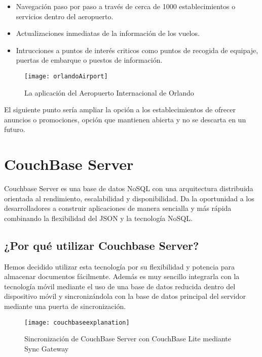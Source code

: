 \begin{itemize}
\item Navegación paso por paso a través de cerca de 1000 establecimientos o servicios dentro del aeropuerto. 
\item Actualizaciones inmediatas de la información de los vuelos. 
\item Intrucciones a puntos de interés criticos como puntos de recogida de equipaje, puertas de embarque o puestos de información.
\end{itemize}

\begin{figure}[H]
	\centering
	\texttt{[image: orlandoAirport]}
	\caption{La aplicación del Aeropuerto Internacional de Orlando}
	\label{fig:orlandoAirport}
\end{figure}

El siguiente punto sería ampliar la opción a los establecimientos de ofrecer anuncios o promociones, opción que mantienen abierta y no se descarta en un futuro.



\section{CouchBase Server}

Couchbase Server es una base de datos NoSQL con una arquitectura distribuida orientada al rendimiento, escalabilidad y disponibilidad. Da la oportunidad a los desarrolladores a construir aplicaciones de manera sencialla y más rápida combinando la flexibilidad del JSON y la tecnología NoSQL.

\subsection{¿Por qué utilizar Couchbase Server?}

Hemos decidido utilizar esta tecnología por su flexibilidad y potencia para almacenar documentos fácilmente. Además es muy sencillo integrarla con la tecnología móvil mediante el uso de una base de datos reducida dentro del dispositivo móvil y sincronizándola con la base de datos principal del servidor mediante una puerta de sincronización.

\begin{figure}[H]
	\centering
	\texttt{[image: couchbaseexplanation]}
	\caption{Sincronización de CouchBase Server con CouchBase Lite mediante Sync Gateway}
	\label{fig:couchbaseexplanation}
\end{figure}

